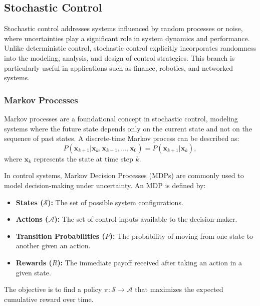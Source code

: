 \documentclass{IEEEojcsys}
\begin{document}
\subsection{Stochastic Control}
Stochastic control addresses systems influenced by random processes or noise, where uncertainties play a significant role in system dynamics and performance. Unlike deterministic control, stochastic control explicitly incorporates randomness into the modeling, analysis, and design of control strategies. This branch is particularly useful in applications such as finance, robotics, and networked systems.

\subsubsection{Markov Processes}
Markov processes are a foundational concept in stochastic control, modeling systems where the future state depends only on the current state and not on the sequence of past states. A discrete-time Markov process can be described as:
\[
P(\mathbf{x}_{k+1} | \mathbf{x}_k, \mathbf{x}_{k-1}, \dots, \mathbf{x}_0) = P(\mathbf{x}_{k+1} | \mathbf{x}_k),
\]
where $\mathbf{x}_k$ represents the state at time step $k$.

In control systems, Markov Decision Processes (MDPs) are commonly used to model decision-making under uncertainty. An MDP is defined by:
\begin{itemize}
    \item \textbf{States ($\mathcal{S}$):} The set of possible system configurations.
    \item \textbf{Actions ($\mathcal{A}$):} The set of control inputs available to the decision-maker.
    \item \textbf{Transition Probabilities ($P$):} The probability of moving from one state to another given an action.
    \item \textbf{Rewards ($R$):} The immediate payoff received after taking an action in a given state.
\end{itemize}
The objective is to find a policy $\pi: \mathcal{S} \to \mathcal{A}$ that maximizes the expected cumulative reward over time.
\end{document}
